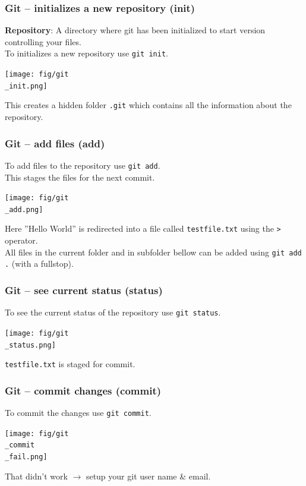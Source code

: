 \documentclass{beamer}
\begin{document}
\begin{frame}
  \frametitle{Git -- initializes a new repository (init)}
  \textbf{Repository}: A directory where git has been initialized to start version controlling your files.\\
  \vspace{5mm}
  To initializes a new repository use \texttt{git init}.\\
  \begin{center}
    \texttt{[image: fig/git\\\_init.png]}
   \end{center}
  This creates a hidden folder \texttt{.git} which contains all the information about the repository.\\
\end{frame}
\begin{frame}
  \frametitle{Git -- add files (add)}
  To add files to the repository use \texttt{git add}.\\
  This stages the files for the next commit. 
  \begin{center}
    \texttt{[image: fig/git\\\_add.png]}
   \end{center}
  Here ''Hello World'' is redirected into a file called \texttt{testfile.txt} using the \texttt{>} operator.\\
  All files in the current folder and in subfolder bellow can be added using \texttt{git add .} (with a fullstop).\\
\end{frame}
\begin{frame}
  \frametitle{Git -- see current status (status)}
  To see the current status of the repository use \texttt{git status}.\\
  \begin{center}
    \texttt{[image: fig/git\\\_status.png]}
   \end{center}
  \texttt{testfile.txt} is staged for commit.\\
\end{frame}
\begin{frame}
  \frametitle{Git -- commit changes (commit)}
  To commit the changes use \texttt{git commit}.\\
  \begin{center}
    \texttt{[image: fig/git\\\_commit\\\_fail.png]}
  \end{center}
  That didn't work $\rightarrow$ setup your git user name \& email.\\
\end{frame}
\end{document}
